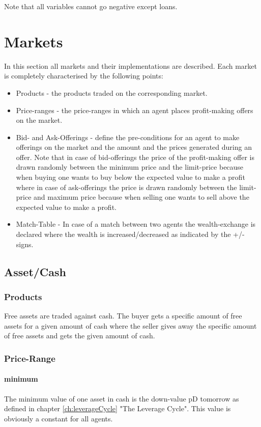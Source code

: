 \documentclass[Bachelorarbeit.tex]{subfiles}
\begin{document}
Note that all variables cannot go negative except loans.

\section{Markets}
In this section all markets and their implementations are described. Each market is completely characterised by the following points:

\begin{itemize}
\item Products - the products traded on the corresponding market.
\item Price-ranges - the price-ranges in which an agent places profit-making offers on the market.
\item Bid- and Ask-Offerings - define the pre-conditions for an agent to make offerings on the market and the amount and the prices generated during an offer. \medskip
Note that in case of bid-offerings the price of the profit-making offer is drawn randomly between the minimum price and the limit-price because when buying one wants to buy below the expected value to make a profit where in case of ask-offerings the price is drawn randomly between the limit-price and maximum price because when selling one wants to sell above the expected value to make a profit.
\item Match-Table - In case of a match between two agents the wealth-exchange is declared where the wealth is increased/decreased as indicated by the +/- signs.
\end{itemize}

\subsection{Asset/Cash}
\subsubsection{Products}
Free assets are traded against cash. The buyer gets a specific amount of free assets for a given amount of cash where the seller gives away the specific amount of free assets and gets the given amount of cash.

\subsubsection{Price-Range}

\paragraph{minimum}
The minimum value of one asset in cash is the down-value pD tomorrow as defined in chapter \ref{ch:leverageCycle} "The Leverage Cycle". This value is obviously a constant for all agents.
\end{document}

